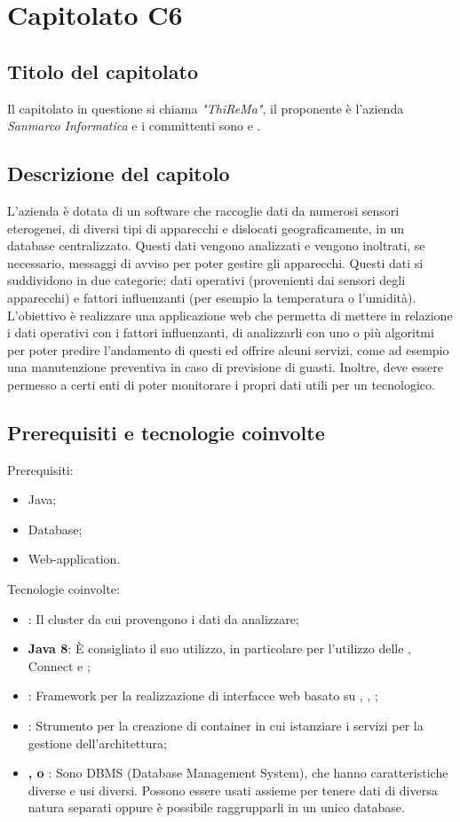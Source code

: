 \section{Capitolato C6}
\subsection{Titolo del capitolato}
Il capitolato in questione si chiama \textit{"ThiReMa"}, il proponente \`e l'azienda \textit{Sanmarco Informatica} e i committenti sono \VT{} e \CR{}.

\subsection{Descrizione del capitolo}
L'azienda \`e dotata di un software che raccoglie dati da numerosi sensori eterogenei, di diversi tipi di apparecchi e dislocati geograficamente, in un database centralizzato. Questi dati vengono analizzati e vengono inoltrati, se necessario, messaggi di avviso per poter gestire gli apparecchi. Questi dati si suddividono in due categorie: dati operativi (provenienti dai sensori degli apparecchi) e fattori influenzanti (per esempio la temperatura o l'umidità).
L'obiettivo \`e realizzare una applicazione web che permetta di mettere in relazione i dati operativi con i fattori influenzanti, di analizzarli con uno o più algoritmi per poter predire l'andamento di questi ed offrire alcuni servizi, come ad esempio una manutenzione preventiva in caso di previsione di guasti. Inoltre, deve essere permesso a certi enti di poter monitorare i propri dati utili per un  tecnologico.


\subsection{Prerequisiti e tecnologie coinvolte}
Prerequisiti:
\begin{itemize}
\item Java;	
\item Database;
\item Web-application.
\end{itemize}
Tecnologie coinvolte:
\begin{itemize}
\item \textbf{}: Il cluster da cui provengono i dati da analizzare;
\item \textbf{Java 8}: È consigliato il suo utilizzo, in particolare per l'utilizzo delle  , Connect e ;
\item \textbf{}: Framework per la realizzazione di interfacce web basato su , , ;
\item \textbf{}: Strumento per la creazione di container in cui istanziare i servizi per la gestione dell'architettura;
\item \textbf{,  o }: Sono DBMS (Database Management System), che hanno caratteristiche diverse e usi diversi. Possono essere usati assieme per tenere dati di diversa natura separati oppure \`e possibile raggrupparli in un unico database.
\end{itemize}

